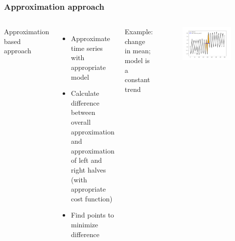 \documentclass[intlimits, 9pt, unicode]{beamer}
\begin{document}
\begin{frame}
    \frametitle{Approximation approach}
  \begin{columns}[T,onlytextwidth]
	Approximation based approach
	    \begin{itemize}
	    	\item Approximate time series with appropriate model
		\item Calculate difference between overall approximation and approximation of left and right halves (with appropriate cost function)
		\item Find points to minimize difference
	    \end{itemize}
      Example: change in mean; model is a constant trend
      	\begin{figure}
		\includegraphics[scale=0.2]{images/approaches_second_3}
	\end{figure}
     \end{columns}
\end{frame}
\end{document}

